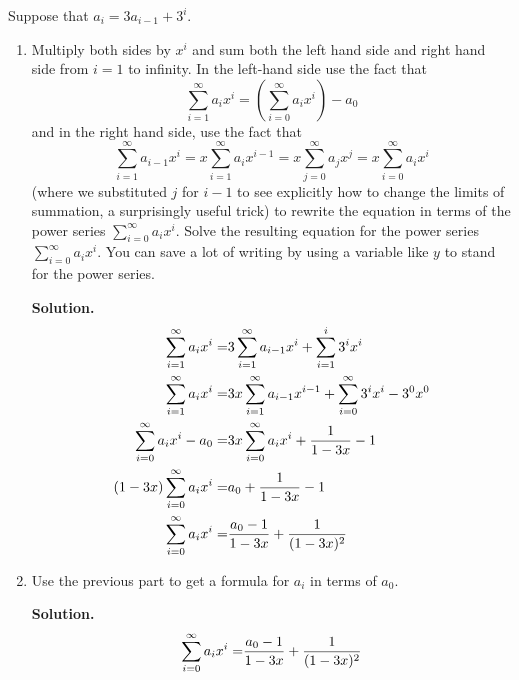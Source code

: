 \documentclass{book}
\begin{document}
\setcounter{project}{258}
\addtocounter{project}{-1}
\begin{activity}[]\label{substituteandsolve}
\hypertarget{p-1401}{}%
Suppose that \(a_i=3a_{i-1} + 3^i\).%
\begin{enumerate}[font=\bfseries,label=(\alph*),ref=\alph*]
\item\label{task-247} \hypertarget{p-1402}{}%
Multiply both sides by \(x^i\) and sum both the left hand side and right hand side from \(i=1\) to infinity.  In the left-hand side use the fact that%
\begin{equation*}
\sum_{i=1}^\infty a_ix^i = (\sum_{i=0}^\infty a_ix^i) - a_0
\end{equation*}
and in the right hand side, use the fact that%
\begin{equation*}
\sum_{i=1}^\infty a_{i-1}x^i = x\sum_{i=1}^\infty a_ix^{i-1}
=x\sum_{j=0}^\infty a_jx^j =x\sum_{i=0}^\infty a_ix^i
\end{equation*}
(where we substituted \(j\) for \(i-1\) to see explicitly how to change the limits of summation, a surprisingly useful trick) to rewrite the equation in terms of the power series \(\sum_{i=0}^\infty a_ix^i\).  Solve the resulting equation for the power series \(\sum_{i=0}^\infty a_ix^i\). You can save a lot of writing by using a variable like \(y\) to stand for the power series.%
\par\smallskip%
\noindent\textbf{Solution.}\hypertarget{solution-194}{}\quad%
\hypertarget{p-1403}{}%
%
\begin{align*}
\sum_{i=1}^\infty a_ix^i  =& 3\sum_{i=1}^\infty
a_{i-1}x^i+\sum_{i=1}^i3^ix^i\\
\sum_{i=1}^\infty a_ix^i =& 3x\sum_{i=1}^\infty a_{i-1}x^{i-1}+
\sum_{i=0}^\infty 3^ix^i-3^0x^0\\
\sum_{i=0}^\infty a_ix^i -a_0 =& 3x\sum_{i=0}^\infty a_{i}x^{i}+
\frac{1}{1-3x}-1\\
(1-3x)\sum_{i=0}^\infty a_ix^i  =& a_0+\frac{1}{1-3x} -1\\
\sum_{i=0}^\infty a_ix^i  =& \frac{a_0-1}{1-3x}+\frac{1}{(1-3x)^2}
\end{align*}
%
\item\label{task-248} \hypertarget{p-1404}{}%
Use the previous part to get a formula for \(a_i\) in terms of \(a_0\).%
\par\smallskip%
\noindent\textbf{Solution.}\hypertarget{solution-195}{}\quad%
\hypertarget{p-1405}{}%
%
\begin{align*}
\sum_{i=0}^\infty a_i x^i  =\amp \frac{a_0-1}{1-3x} + \frac{1}{(1-3x)^2}\\

\end{align*}
\end{enumerate}
\end{activity}
\end{document}

